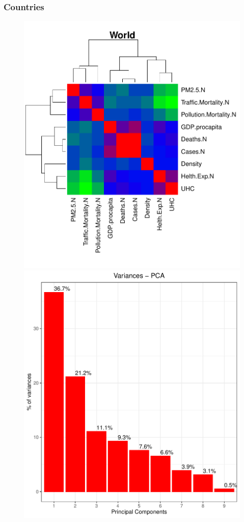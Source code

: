 \documentclass[compress]{beamer}
\begin{document}
\begin{frame}
\frametitle{Countries}
\begin{figure}[H]
\centering
\begin{minipage}{.6\textwidth}
  \centering
  \includegraphics[width=\linewidth, ]{Pic/CorrMatrix_WORLD.pdf}
\end{minipage}%
\begin{minipage}{.3\textwidth}
  \centering
  \includegraphics[width=\linewidth,]{Pic/Variances-PCA_WORLD.pdf}

\end{minipage}
\end{figure}
\end{frame}
\end{document}
